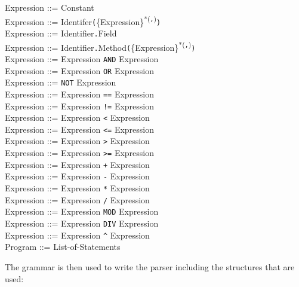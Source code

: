 \documentclass{article}
\begin{document}
\noindent
Expression ::= Constant\\
Expression ::= Identifer\texttt{(}\{Expression\}\textsuperscript{*(\texttt{,})}\texttt{)}\\
Expression ::= Identifier\texttt{.}Field\\
Expression ::= Identifier\texttt{.}Method\texttt{(}\{Expression\}\textsuperscript{*(\texttt{,})}\texttt{)}\\

\noindent
Expression ::= Expression \texttt{AND} Expression\\
Expression ::= Expression \texttt{OR} Expression\\
Expression ::= \texttt{NOT} Expression\\

\noindent
Expression ::= Expression \texttt{==} Expression\\
Expression ::= Expression \texttt{!=} Expression\\
Expression ::= Expression \texttt{\textless{}} Expression\\
Expression ::= Expression \texttt{\textless=} Expression\\
Expression ::= Expression \texttt{\textgreater{}} Expression\\
Expression ::= Expression \texttt{\textgreater=} Expression\\

\noindent
Expression ::= Expression \texttt{+} Expression\\
Expression ::= Expression \texttt{-} Expression\\
Expression ::= Expression \texttt{*} Expression\\
Expression ::= Expression \texttt{/} Expression\\
Expression ::= Expression \texttt{MOD} Expression\\
Expression ::= Expression \texttt{DIV} Expression\\
Expression ::= Expression \texttt{\textasciicircum{}} Expression\\

\noindent
Program ::= List-of-Statements

The grammar is then used to write the parser including the structures that are
used:
\end{document}
